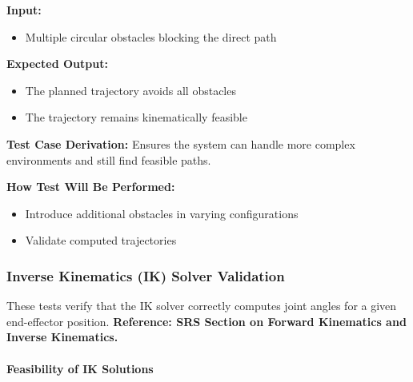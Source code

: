 \documentclass[12pt, titlepage]{article}
\begin{document}
\begin{enumerate}
\textbf{Input:}  
\begin{itemize}
    \item Multiple circular obstacles blocking the direct path  
\end{itemize}

\textbf{Expected Output:}  
\begin{itemize}
    \item The planned trajectory avoids all obstacles  
    \item The trajectory remains kinematically feasible  
\end{itemize}

\textbf{Test Case Derivation:} Ensures the system can handle more complex environments and still find feasible paths.  

\textbf{How Test Will Be Performed:}  
\begin{itemize}
    \item Introduce additional obstacles in varying configurations  
    \item Validate computed trajectories  
\end{itemize}

\end{enumerate}

\subsubsection{Inverse Kinematics (IK) Solver Validation}

These tests verify that the IK solver correctly computes joint angles for a given end-effector position. \textbf{Reference: SRS Section on Forward Kinematics and Inverse Kinematics.}

\paragraph{Feasibility of IK Solutions}
\end{document}
